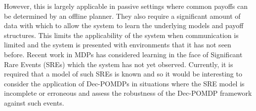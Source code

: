 \documentclass[../sample.tex]{subfiles}
\begin{document}
However, this is largely applicable in passive settings where common payoffs can be determined by an
offline planner. They also require a significant amount of data with which to allow the system to
learn the underlying models and payoff structures. This limits the applicability of the system when
communication is limited and the system is presented with environments that it has not seen before. 
Recent work in MDPs \cite{Klima2019RobustDomains} has considered learning in the face of Significant
Rare Events (SREs) which the system has not yet observed. Currently, it is required that a model of
such SREs is known and so it would be interesting to consider the application of Dec-POMDPs in
situations where the SRE model is incomplete or erroneous and assess the robustness of the Dec-POMDP
framework against such events.
\end{document}
